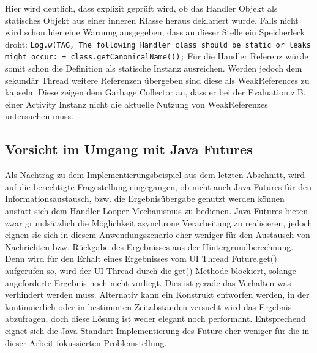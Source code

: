 \documentclass[12pt,oneside,a4paper,bibtotoc,liststotoc]{scrreprt}
\begin{document}
Hier wird deutlich, dass explizit geprüft wird, ob das Handler Objekt als statisches Objekt aus einer inneren Klasse heraus deklariert wurde. Falls nicht wird schon hier eine Warnung ausgegeben, dass an dieser Stelle ein Speicherleck droht:\newline
\texttt{Log.w(TAG, \grqq The following Handler class should be static or leaks might occur: \grqq +
               	class.getCanonicalName());}\newline
Für die Handler Referenz würde somit schon die Definition als statische Instanz ausreichen. Werden jedoch dem sekundär Thread weitere Referenzen übergeben sind diese als WeakReferences zu kapseln. Diese zeigen dem Garbage Collector an, dass er bei der Evaluation z.B. einer Activity Instanz nicht die aktuelle Nutzung von WeakReferenzes untersuchen muss.

\subsection{Vorsicht im Umgang mit Java Futures}
Als Nachtrag zu dem Implementierungsbeispiel aus dem letzten Abschnitt, wird auf die berechtigte Fragestellung eingegangen, ob nicht auch Java Futures für den Informationsaustausch, bzw. die Ergebnisübergabe genutzt werden können anstatt sich dem Handler Looper Mechanismus zu bedienen. Java Futures bieten zwar grundsätzlich die Möglichkeit asynchrone Verarbeitung zu realisieren, jedoch eignen sie sich in diesem Anwendungszenario eher weniger für den Austausch von Nachrichten bzw. Rückgabe des Ergebnisses aus der Hintergrundberechnung. Denn wird für den Erhalt eines Ergebnisses vom UI Thread Future.get() aufgerufen so, wird der UI Thread durch die get()-Methode blockiert, solange angeforderte Ergebnis noch nicht vorliegt. Dies ist gerade das Verhalten was verhindert werden muss. Alternativ kann ein Konstrukt entworfen werden, in der kontinuierlich oder in bestimmten Zeitabständen versucht wird das Ergebnis abzufragen, doch diese Lösung ist weder elegant noch performant. Entsprechend eignet sich die Java Standart Implementierung des Future eher weniger für die in dieser Arbeit fokussierten Problemstellung. 
\end{document}
